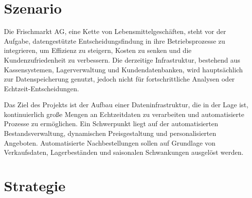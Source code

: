 \documentclass[%
pdftex,
oneside,			%
11pt,				%
parskip=half,		%
headheight = 12pt,	%
headsepline,		%
footsepline,		%
footheight = 16pt,	%
abstracton,		%
DIV=calc,		%
BCOR=8mm,		%
headinclude=false,	%
footinclude=false,	%
listof=totoc,		%
toc=bibliography,	%
]{scrreprt}	%
\newcommand{\comment}[1]{\par {\bfseries \color{blue} #1 \par}} %
\begin{document}
\newpage






\section{Szenario}

    Die Frischmarkt AG, eine Kette von Lebensmittelgeschäften, steht vor der Aufgabe, datengestützte Entscheidungsfindung in ihre Betriebsprozesse zu integrieren, um Effizienz zu steigern, Kosten zu senken und die Kundenzufriedenheit zu verbessern.
    Die derzeitige Infrastruktur, bestehend aus Kassensystemen, Lagerverwaltung und Kundendatenbanken, wird hauptsächlich zur Datenspeicherung genutzt, jedoch nicht für fortschrittliche Analysen oder Echtzeit-Entscheidungen.

    Das Ziel des Projekts ist der Aufbau einer Dateninfrastruktur, die in der Lage ist, kontinuierlich große Mengen an Echtzeitdaten zu verarbeiten und automatisierte Prozesse zu ermöglichen.
    Ein Schwerpunkt liegt auf der automatisierten Bestandsverwaltung, dynamischen Preisgestaltung und personalisierten Angeboten.
    Automatisierte Nachbestellungen sollen auf Grundlage von Verkaufsdaten, Lagerbeständen und saisonalen Schwankungen ausgelöst werden.

\section{Strategie}
\end{document}
